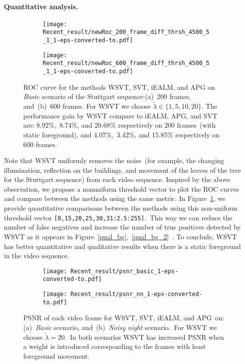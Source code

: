 \documentclass[twoside,11pt]{article}
\begin{document}
\paragraph{Quantitative analysis.}
\begin{figure}
	\centering
	\begin{subfigure}[b]{0.55\textwidth}
		\texttt{[image: Recent\_result/newRoc\_200\_frame\_diff\_thrsh\_4500\_5\_1\_1-eps-converted-to.pdf]}
		\caption{}
	\end{subfigure}%
	\begin{subfigure}[b]{0.55\textwidth}
		\texttt{[image: Recent\_result/newRoc\_600\_frame\_diff\_thrsh\_4500\_5\_1\_1-eps-converted-to.pdf]}
		\caption{}
	\end{subfigure}
	\caption{ROC curve for the methods WSVT, SVT, iEALM, and APG on {\it Basic} scenario of the Stuttgart sequence:(a)~200 frames, and~(b)~600 frames. For WSVT we choose $\tilde{\lambda}\in\{1,5,10,20\}$. The performance gain by WSVT compare to iEALM, APG, and SVT are: 8.92\%,~8.74\%, and 20.68\% respectively on 200 frames~(with static foreground), and 4.07\%,~3.42\%, and 15.85\% respectively on 600 frames.}\label{roc_new}
\end{figure}
Note that WSVT uniformly removes the noise~(for example, the changing illumination, reflection on the buildings, and movement of the leaves of the tree for the Stuttgart sequence) from each video sequence. 
Inspired by the above observation, we propose a nonuniform threshold vector to plot the ROC curves and compare between the methods using the same metric. In Figure~\ref{roc_new}, we provide quantitative comparisons between the methods using this non-uniform threshold vector \verb+[0,15,20,25,30,31:2.5:255]+.~This way we can reduce the number of false negatives and increase the number of true positives detected by WSVT as it appears in Figure~\ref{qual_bg},~\ref{qual_bg_2}~. To conclude, WSVT has better quantitative and qualitative results when there is a static foreground in the video sequence.
\begin{figure}
	\centering
	\begin{subfigure}[b]{0.55\textwidth}
		\texttt{[image: Recent\_result/psnr\_basic\_1-eps-converted-to.pdf]}
		\caption{}
	\end{subfigure}%
	\begin{subfigure}[b]{0.55\textwidth}
		\texttt{[image: Recent\_result/psnr\_nn\_1-eps-converted-to.pdf]}
		\caption{}
	\end{subfigure}
	\caption{PSNR of each video frame for WSVT, SVT, iEALM, and APG~on:(a)~{\it Basic} scenario, and~(b)~{\it Noisy night} scenario.~For WSVT we choose $\tilde{\lambda}=20$.~In both scenarios WSVT has increased PSNR when a weight is introduced corresponding to the frames with least foreground movement.}\label{psnr}
\end{figure}  
\end{document}
